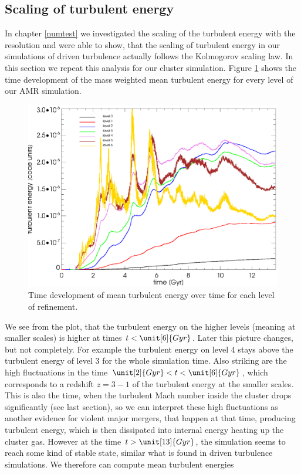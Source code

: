 \subsection{Scaling of turbulent energy}
In chapter \ref{numtest} we investigated the scaling of the turbulent energy
with the resolution and were able to show, that the scaling
of turbulent energy in our simulations of driven turbulence actually follows
the Kolmogorov scaling law. In this section we repeat this analysis for our 
cluster simulation. Figure \ref{fig:tuerescluster} shows the time development of
the mass weighted mean turbulent energy for every level of our AMR simulation. 
\begin{figure}[tp]
\centering
\includegraphics[width=0.7\linewidth]{chapter9/tuemwrescluster128sar.eps}
\caption{Time development of mean turbulent energy over time for each level of
refinement.}
\label{fig:tuerescluster}
\end{figure}
We see from the plot, that the turbulent energy on the higher levels (meaning
at smaller scales) is higher at times $t<\unit[6]{Gyr}$. Later this picture
changes, but not completely. For example the turbulent energy on level 4 stays
above the turbulent energy of level 3 for the whole simulation time. Also
striking are the high fluctuations in the time $\unit[2]{Gyr}<t<\unit[6]{Gyr}$,
which corresponds to a redshift $z=3-1$ of the turbulent energy at the smaller
scales. This is also the time, when the turbulent Mach number inside the
cluster drops significantly (see last section), so we can interpret these high
fluctuations as another evidence for violent major mergers, that happen at that
time, producing turbulent energy, which is then dissipated into internal energy
heating up the cluster gas. However at the time $t>\unit[13]{Gyr}$, the
simulation seems to reach some kind of stable state, similar what is found in
driven turbulence simulations. We therefore can compute mean turbulent energies
